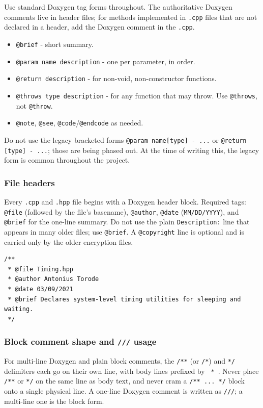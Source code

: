 Use standard Doxygen tag forms throughout. The authoritative Doxygen comments live in header files; for methods implemented in \texttt{.cpp} files that are not declared in a header, add the Doxygen comment in the \texttt{.cpp}.
\begin{itemize}\itemsep0em
    \item \texttt{@brief} - short summary.
    \item \texttt{@param name description} - one per parameter, in order.
    \item \texttt{@return description} - for non-void, non-constructor functions.
    \item \texttt{@throws type description} - for any function that may throw. Use \texttt{@throws}, not \texttt{@throw}.
    \item \texttt{@note}, \texttt{@see}, \texttt{@code}/\texttt{@endcode} as needed.
\end{itemize}
Do not use the legacy bracketed forms \texttt{@param name[type] - ...} or \texttt{@return [type] - ...}; those are being phased out. At the time of writing this, the legacy form is common throughout the project.

\subsubsection*{File headers}

Every \texttt{.cpp} and \texttt{.hpp} file begins with a Doxygen header block. Required tags: \texttt{@file} (followed by the file's basename), \texttt{@author}, \texttt{@date} (\texttt{MM/DD/YYYY}), and \texttt{@brief} for the one-line summary. Do not use the plain \texttt{Description:} line that appears in many older files; use \texttt{@brief}. A \texttt{@copyright} line is optional and is carried only by the older encryption files.
\begin{lstlisting}[style=cppstyle]
/**
 * @file Timing.hpp
 * @author Antonius Torode
 * @date 03/09/2021
 * @brief Declares system-level timing utilities for sleeping and waiting.
 */
\end{lstlisting}

\subsubsection*{Block comment shape and \texttt{///} usage}

For multi-line Doxygen and plain block comments, the \texttt{/**} (or \texttt{/*}) and \texttt{*/} delimiters each go on their own line, with body lines prefixed by \texttt{ * }. Never place \texttt{/**} or \texttt{*/} on the same line as body text, and never cram a \texttt{/** ... */} block onto a single physical line. A one-line Doxygen comment is written as \texttt{///}; a multi-line one is the block form.

